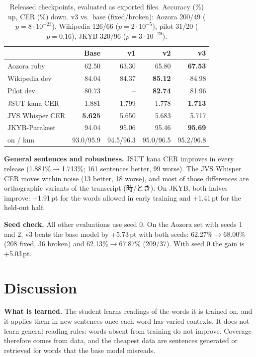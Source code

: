 \documentclass[10pt,a4paper,twocolumn]{article}
\newcommand{\pt}{\,pt}
\begin{document}
\begin{table}[t]
\centering\small
\caption{Released checkpoints, evaluated as exported files. Accuracy (\%) up, CER (\%) down.
v3 vs.\ base (fixed/broken): Aozora 200/49 ($p{=}8\cdot10^{-23}$), Wikipedia 126/66
($p{=}2\cdot10^{-5}$), pilot 31/20 ($p{=}0.16$), JKYB 320/96 ($p{=}3\cdot10^{-29}$).}
\label{tab:release}
\footnotesize\setlength{\tabcolsep}{3.5pt}
\begin{tabular}{@{}lrrrr@{}}
\toprule
& Base & v1 & v2 & v3\\
\midrule
Aozora ruby & 62.50 & 63.30 & 65.80 & \textbf{67.53}\\
Wikipedia dev & 84.04 & 84.37 & \textbf{85.12} & 84.98\\
Pilot dev & 80.73 & -- & \textbf{82.74} & 81.96\\
JSUT kana CER & 1.881 & 1.799 & 1.778 & \textbf{1.713}\\
JVS Whisper CER & \textbf{5.625} & 5.650 & 5.683 & 5.717\\
JKYB-Parakeet & 94.04 & 95.06 & 95.46 & \textbf{95.69}\\
\quad on / kun & 93.0/95.9 & 94.5/96.3 & 95.0/96.5 & 95.2/96.8\\
\bottomrule
\end{tabular}
\end{table}

\textbf{General sentences and robustness.} JSUT kana CER improves in every release
(1.881\%$\to$1.713\%; 161 sentences better, 99 worse). The JVS Whisper CER moves within noise
(13 better, 18 worse), and most of those differences are orthographic variants of the
transcript (時/とき). On JKYB, both halves improve: +1.91\pt{} for the words allowed in early
training and +1.41\pt{} for the held-out half.

\textbf{Seed check.} All other evaluations use seed 0. On the Aozora set with seeds 1 and 2, v3 beats
the base model by +5.73\pt{} with both seeds: 62.27\%$\to$68.00\% (208 fixed, 36 broken) and
62.13\%$\to$67.87\% (209/37). With seed 0 the gain is +5.03\pt.

\section{Discussion}
\textbf{What is learned.} The student learns readings of the words it is trained on, and it
applies them in new sentences once each word has varied contexts. It does not learn
general reading rules: words absent from training do not improve. Coverage therefore comes from
data, and the cheapest data are sentences generated or retrieved for words that the base model
misreads.
\end{document}
